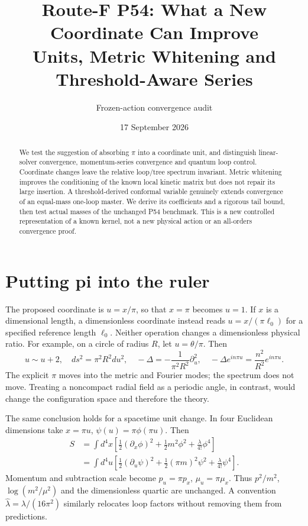 \documentclass[11pt]{article}
\title{Route-F P54: What a New Coordinate Can Improve\\
Units, Metric Whitening and Threshold-Aware Series}
\author{Frozen-action convergence audit}
\date{17 September 2026}
\begin{document}
\maketitle
\begin{abstract}
We test the suggestion of absorbing $\pi$ into a coordinate unit, and
distinguish linear-solver convergence, momentum-series convergence and
quantum loop control. Coordinate changes leave the relative loop/tree
spectrum invariant. Metric whitening improves the conditioning of the
known local kinetic matrix but does not repair its large insertion.
A threshold-derived conformal variable genuinely extends convergence of
an equal-mass one-loop master. We derive its coefficients and a rigorous
tail bound, then test actual masses of the unchanged P54 benchmark.
This is a new controlled representation of a known kernel, not a new
physical action or an all-orders convergence proof.
\end{abstract}

\section{Putting pi into the ruler}
The proposed coordinate is $u=x/\pi$, so that $x=\pi$ becomes $u=1$.
If $x$ is a dimensional length, a dimensionless coordinate instead reads
$u=x/(\pi\ell_0)$ for a specified reference length $\ell_0$.
Neither operation changes a dimensionless physical ratio.
For example, on a circle of radius $R$, let $u=\theta/\pi$. Then
\begin{equation}
 u\sim u+2,\quad ds^2=\pi^2R^2du^2,\quad
 -\Delta=-\frac1{\pi^2R^2}\partial_u^2,\quad
 -\Delta e^{in\pi u}=\frac{n^2}{R^2}e^{in\pi u}.
\end{equation}
The explicit $\pi$ moves into the metric and Fourier modes; the spectrum
does not move. Treating a noncompact radial field as a periodic angle,
in contrast, would change the configuration space and therefore the theory.

The same conclusion holds for a spacetime unit change. In four Euclidean
dimensions take $x=\pi u$, $\psi(u)=\pi\phi(\pi u)$. Then
\begin{align}
 S&=\int d^4x\left[\tfrac12(\partial_x\phi)^2+
               \tfrac12m^2\phi^2+\frac{\lambda}{4!}\phi^4\right]\\
  &=\int d^4u\left[\tfrac12(\partial_u\psi)^2+
               \tfrac12(\pi m)^2\psi^2+\frac{\lambda}{4!}\psi^4\right].
\end{align}
Momentum and subtraction scale become $p_u=\pi p_x$, $\mu_u=\pi\mu_x$.
Thus $p^2/m^2$, $\log(m^2/\mu^2)$ and the dimensionless quartic are
unchanged. A convention $\widehat\lambda=\lambda/(16\pi^2)$ similarly
relocates loop factors without removing them from predictions.
\end{document}
